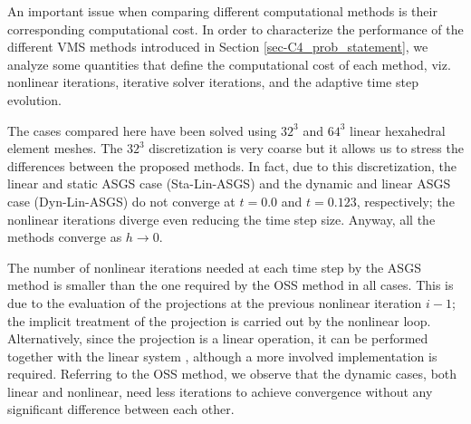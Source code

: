 An important issue when comparing different computational methods is their corresponding computational cost. In order to characterize the performance of the different VMS methods introduced in Section \ref{sec-C4_prob_statement},  we analyze  some quantities that define the computational cost of each method, viz. nonlinear iterations, iterative solver iterations, and the adaptive time step evolution.


The cases compared here have been solved using $32^3$ and $64^3$ linear hexahedral element meshes. The $32^3$ discretization is very coarse but it allows us to stress the differences between the proposed methods. In fact, due to this discretization, the linear and static ASGS case (Sta-Lin-ASGS) and the dynamic and linear ASGS case (Dyn-Lin-ASGS) do not converge at $t=0.0$ and  $t=0.123$, respectively; the nonlinear iterations diverge even reducing the time step size. Anyway, all the methods converge as $h\rightarrow0$.


The number of nonlinear iterations needed at each time step by the ASGS method is smaller than the one required by the OSS method in all cases. This is due to the evaluation of the projections at the previous nonlinear iteration $i-1$; the implicit treatment of the projection is carried out by the nonlinear loop. Alternatively, since the projection is a linear operation, it can be performed together with the linear system \cite{codina_analysis_2008}, although a more involved implementation is required. Referring to the OSS method, we observe that the dynamic cases, both linear and nonlinear, need less iterations to achieve convergence without any significant difference between each other.

